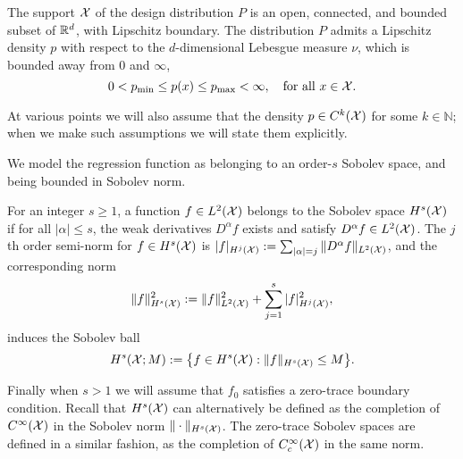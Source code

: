 \begin{definition}
	\label{def:model_flat_euclidean}
	 The support $\mathcal{X}$ of the design distribution $P$ is an open, connected, and bounded subset of $\mathbb{R}^d$, with Lipschitz boundary. The distribution $P$ admits a Lipschitz density $p$ with respect to the $d$-dimensional Lebesgue measure $\nu$, which is bounded away from $0$ and $\infty$,
	\begin{equation*}
	0 < p_{\min} \leq p(x) \leq p_{\max} < \infty, \quad \textrm{for all $x \in \mathcal{X}$.}
	\end{equation*}
\end{definition}
At various points we will also assume that the density $p \in C^k(\mathcal{X})$ for some $k \in \mathbb{N}$; when we make such assumptions we will state them explicitly.

We model the regression function as belonging to an order-$s$ Sobolev space, and being bounded in Sobolev norm.
\begin{definition}
	\label{def:sobolev_space}
	For an integer $s \geq 1$, a function $f \in L^2(\mathcal{X})$ belongs to the Sobolev space $H^s(\mathcal{X})$ if for all $|\alpha| \leq s$, the weak derivatives $D^{\alpha}f$ exists and satisfy $D^{\alpha}f \in L^2(\mathcal{X})$. The $j$th order semi-norm for $f \in H^s(\mathcal{X})$ is $|f|_{H^j(\mathcal{X})} := \sum_{|\alpha| = j}\|D^{\alpha}f\|_{L^2(\mathcal{X})}$, and the corresponding norm
	\begin{equation*}
	\|f\|_{H^s(\mathcal{X})}^2 := \|f\|_{L^2(\mathcal{X})}^2 + \sum_{j = 1}^{s} |f|_{H^j(\mathcal{X})}^2,
	\end{equation*}
	induces the Sobolev ball
	\begin{equation*}
	H^s(\mathcal{X};M) := \bigl\{f \in H^s(\mathcal{X}): \|f\|_{H^s(\mathcal{X})} \leq M\bigr\}.
	\end{equation*} 
\end{definition}
Finally when $s > 1$ we will assume that $f_0$ satisfies a zero-trace boundary condition. Recall that $H^s(\mathcal{X})$ can alternatively be defined as the completion of $C^{\infty}(\mathcal{X})$ in the Sobolev norm $\|\cdot\|_{H^s(\mathcal{X})}$. The zero-trace Sobolev spaces are defined in a similar fashion, as the completion of $C_c^{\infty}(\mathcal{X})$ in the same norm.

